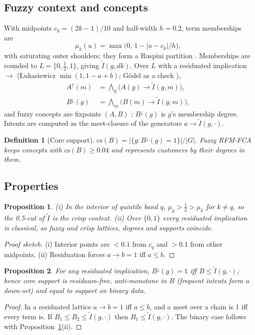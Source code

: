 \documentclass[conference]{IEEEtran}
\newtheorem{proposition}{Proposition}
\newtheorem{definition}{Definition}
\begin{document}
\subsection{Fuzzy context and concepts}
With midpoints $c_k=(2k-1)/10$ and half-width $h=0.2$, term memberships are
\begin{equation}
\mu_k(u)=\max\bigl(0,\,1-|u-c_k|/h\bigr),
\end{equation}
with saturating outer shoulders; they form a Ruspini partition \cite{ruspini1969}. Memberships are rounded to $L=\{0,\tfrac12,1\}$, giving $\tilde I(g,dk)$. Over $L$ with a residuated implication $\to$ (Łukasiewicz $\min(1,1-a+b)$; Gödel as a check \cite{hajek1998}),
\begin{align}
A^{\uparrow}(m)&=\textstyle\bigwedge_{g}\bigl(A(g)\to\tilde I(g,m)\bigr),\\
B^{\downarrow}(g)&=\textstyle\bigwedge_{m}\bigl(B(m)\to\tilde I(g,m)\bigr),
\end{align}
and fuzzy concepts are fixpoints $(A,B)$ \cite{belohlavek2004}; $B^{\downarrow}(g)$ is $g$'s membership degree. Intents are computed as the meet-closure of the generators $a\to\tilde I(g,\cdot)$.

\begin{definition}[Core support]
$\mathrm{cs}(B)=|\{g:B^{\downarrow}(g)=1\}|/|G|$. Fuzzy RFM-FCA keeps concepts with $\mathrm{cs}(B)\ge0.04$ and represents customers by their degrees in them.
\end{definition}

\subsection{Properties}
\begin{proposition}\label{prop:special}
(i) In the interior of quintile band $q$, $\mu_q>\tfrac12>\mu_k$ for $k\neq q$, so the 0.5-cut of $\tilde I$ is the crisp context. (ii) Over $\{0,1\}$ every residuated implication is classical, so fuzzy and crisp lattices, degrees and supports coincide.
\end{proposition}
\begin{proof}[Proof sketch]
(i) Interior points are $<0.1$ from $c_q$ and $>0.1$ from other midpoints. (ii) Residuation forces $a\to b=1$ iff $a\le b$.
\end{proof}

\begin{proposition}\label{prop:core}
For any residuated implication, $B^{\downarrow}(g)=1$ iff $B\le\tilde I(g,\cdot)$; hence core support is residuum-free, anti-monotone in $B$ (frequent intents form a down-set) and equal to support on binary data.
\end{proposition}
\begin{proof}
In a residuated lattice $a\to b=1$ iff $a\le b$, and a meet over a chain is 1 iff every term is. If $B_1\le B_2\le\tilde I(g,\cdot)$ then $B_1\le\tilde I(g,\cdot)$. The binary case follows with Proposition~\ref{prop:special}(ii).
\end{proof}
\end{document}

